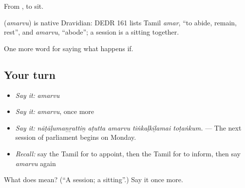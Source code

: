 From , to sit.

\begin{cousinweb}
\textbf{} (\emph{amarvu}) is native Dravidian: DEDR 161 lists Tamil \emph{amar}, \textquotedblleft{}to abide, remain, rest\textquotedblright{}, and \emph{amarvu}, \textquotedblleft{}abode\textquotedblright{}; a session is a sitting together.
\end{cousinweb}

\begin{grammarlens}[title={What you've built}]
One more word for saying what happens if.
\end{grammarlens}

\subsection*{Your turn}
\begin{itemize}
\raggedright
  \item \emph{Say it:} \emph{amarvu}
  \item \emph{Say it:} \emph{amarvu}, once more
  \item \emph{Say it:} \emph{nāṭāḷumaṉṟattiṉ aṭutta amarvu tiṅkaḷkiḻamai toṭaṅkum.} — The next session of parliament begins on Monday.
  \item \emph{Recall:} say the Tamil for to appoint, then the Tamil for to inform, then say \emph{amarvu} again
\end{itemize}

\begin{tcolorbox}[breakable,colback=teal!4,colframe=teal!35!black,title={Before you move on}]
What does  mean? (\textquotedblleft{}A session; a sitting\textquotedblright{}.) Say it once more.
\end{tcolorbox}
